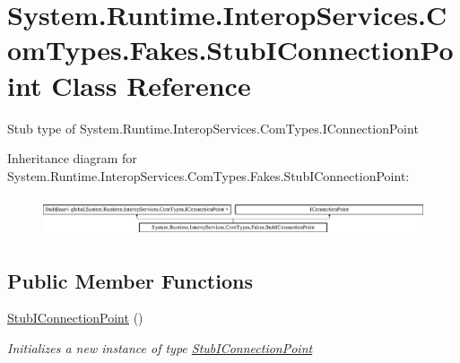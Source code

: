 \hypertarget{class_system_1_1_runtime_1_1_interop_services_1_1_com_types_1_1_fakes_1_1_stub_i_connection_point}{\section{System.\-Runtime.\-Interop\-Services.\-Com\-Types.\-Fakes.\-Stub\-I\-Connection\-Point Class Reference}
\label{class_system_1_1_runtime_1_1_interop_services_1_1_com_types_1_1_fakes_1_1_stub_i_connection_point}
}


Stub type of System.\-Runtime.\-Interop\-Services.\-Com\-Types.\-I\-Connection\-Point 


Inheritance diagram for System.\-Runtime.\-Interop\-Services.\-Com\-Types.\-Fakes.\-Stub\-I\-Connection\-Point\-:\begin{figure}[H]
\begin{center}
\leavevmode
\includegraphics[height=1.171548cm]{class_system_1_1_runtime_1_1_interop_services_1_1_com_types_1_1_fakes_1_1_stub_i_connection_point}
\end{center}
\end{figure}
\subsection*{Public Member Functions}
\begin{DoxyCompactItemize}
\item 
\hyperlink{class_system_1_1_runtime_1_1_interop_services_1_1_com_types_1_1_fakes_1_1_stub_i_connection_point_aaa65a82f7925e9ed1e30f5cc6c421fde}{Stub\-I\-Connection\-Point} ()
\begin{DoxyCompactList}\small\item\em Initializes a new instance of type \hyperlink{class_system_1_1_runtime_1_1_interop_services_1_1_com_types_1_1_fakes_1_1_stub_i_connection_point}{Stub\-I\-Connection\-Point}\end{DoxyCompactList}\end{DoxyCompactItemize}
